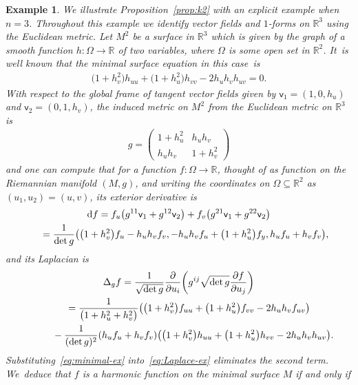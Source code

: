 \documentclass[pdftex]{sigma}
\def\R{\mathbb{R}}
\def\vv{\mathsf{v}}
\newtheorem{Example}[Theorem]{Example}
\numberwithin{equation}{section}
\begin{document}
\begin{Example} %
We illustrate Proposition~\ref{prop:k2} with an explicit example when $n=3$. Throughout this example we identify vector fields and $1$-forms on $\R^3$ using the Euclidean metric. Let $M^2$ be a surface in $\R^3$ which is given by the graph of a smooth function $h\colon \Omega \to \R$ of two variables, where $\Omega$ is some open set in $\R^2$. It~is well known that the minimal surface equation in this case~is
\begin{gather} \label{eq:minimal-ex}
\big(1 + h_v^2\big) h_{uu} + \big(1 + h_u^2\big) h_{vv} - 2 h_u h_v h_{uv} = 0.
\end{gather}
With respect to the global frame of tangent vector fields given by $\vv_1 = ( 1, 0, h_u)$ and $\vv_2 = (0, 1, h_v)$, the induced metric on $M^2$ from the Euclidean metric on $\R^3$ is
\begin{gather*}
g = \begin{pmatrix} 1 + h_u^2 & h_u h_v \\ h_u h_v & 1 + h_v^2 \end{pmatrix}
\end{gather*}
and one can compute that for a function $f\colon \Omega \to \R$, thought of as function on the Riemannian manifold $(M, g)$, and writing the coordinates on $\Omega \subseteq \R^2$ as $(u_1, u_2) = (u,v)$, its exterior derivative is
\begin{gather}
{\rm d} f = f_u \big(g^{11} \vv_1 + g^{12} \vv_2\big) + f_v \big(g^{21} \vv_1 + g^{22} \vv_2\big) \nonumber
\\ \hphantom{{\rm d} f}
\label{eq:exterior-ex}
 {}= \frac{1}{\det g} \big( \big(1 + h_v^2\big) f_u - h_u h_v f_v, - h_u h_v f_u + \big(1 + h_u^2\big) f_y, h_u f_u + h_v f_v \big),
\end{gather}
and its Laplacian is
\begin{gather}
\nonumber
\Delta_g f = \frac{1}{\sqrt{\det g}} \frac{\partial}{\partial u_i}
\bigg(g^{ij} \sqrt{\det g} \frac{\partial f}{\partial u_j} \bigg)
\\ \hphantom{\Delta_g f}
\nonumber
{}= \frac{1}{\big(1 + h_u^2 + h_v^2\big)} \big( \big(1+ h_v^2\big) f_{uu} + \big(1 + h_u^2\big) f_{vv} - 2 h_u h_v f_{uv} \big)
\\ \hphantom{\Delta_g f=}
\label{eq:Laplace-ex}
{} - \frac{1}{(\det g)^2} (h_u f_u + h_v f_v ) \big( \big(1 + h_v^2\big) h_{uu} + \big(1 + h_u^2\big) h_{vv} - 2 h_u h_v h_{uv} \big).
\end{gather}
Substituting~\eqref{eq:minimal-ex} into~\eqref{eq:Laplace-ex} eliminates the second term. We~deduce that $f$ is a harmonic function on the minimal surface $M$ if and only if

\end{Example}
\end{document}
